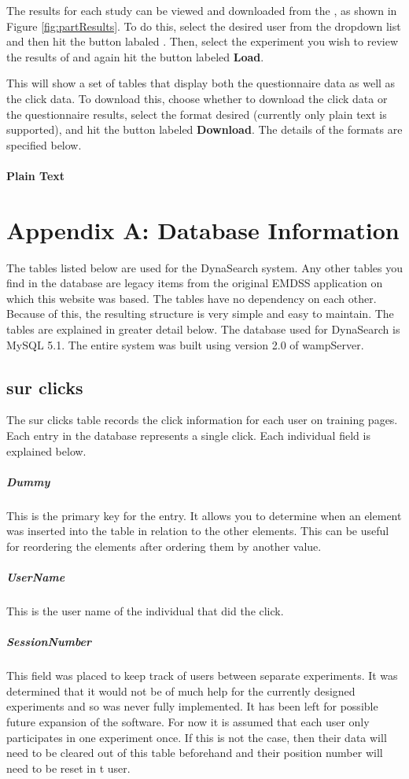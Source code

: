 \documentclass[article]{ij4uq}              %
\begin{document}
The results for each study can be viewed and downloaded from the , as shown in Figure \ref{fig:partResults}.  To do this, select the desired user from the dropdown list and then hit the button labaled .  Then, select the experiment you wish to review the results of and again hit the button labeled \textbf{Load}.

This will show a set of tables that display both the questionnaire data as well as the click data.  To download this, choose whether to download the click data or the questionnaire results, select the format desired (currently only plain text is supported), and hit the button labeled \textbf{Download}.  The details of the formats are specified below.

\paragraph{Plain Text}


\section{Appendix A: Database Information}
The tables listed below are used for the DynaSearch system. Any other tables you find in the database are legacy items from the original EMDSS application on which this website was based. The tables have no dependency on each other. Because of this, the resulting structure is very simple and easy to maintain. The tables are explained in greater detail below. The database used for DynaSearch is MySQL 5.1. The entire system was built using version 2.0 of wampServer.

\subsection{sur clicks}
The sur clicks table records the click information for each user on training pages. Each entry in the database represents a single click. Each individual field is explained below. 

\subparagraph{Dummy}
This is the primary key for the entry. It allows you to determine when an element was inserted into the table in relation to the other elements. This can be useful for reordering the elements after ordering them by another value.

\subparagraph{UserName}
This is the user name of the individual that did the click.

\subparagraph{SessionNumber}
This field was placed to keep track of users between separate experiments. It was determined that it would not be of much help for the currently designed experiments and so was never fully implemented. It has been left for possible future expansion of the software. For now it is assumed that each user only participates in one experiment once. If this is not the case, then their data will need to be cleared out of this table beforehand and their position number will need to be reset in t user.
\end{document}
